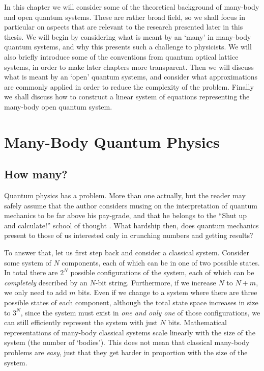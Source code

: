 In this chapter we will consider some of the theoretical background of many-body and open quantum systems. These are rather broad field, so we shall focus in particular on aspects that are relevant to the research presented later in this thesis. We will begin by considering what is meant by an `many' in many-body quantum systems, and why this presents such a challenge to physicists. We will also briefly introduce some of the conventions from quantum optical lattice systems, in order to make later chapters more transparent. Then we will discuss what is meant by an `open' quantum systems, and consider what approximations are commonly applied in order to reduce the complexity of the problem. Finally we shall discuss how to construct a linear system of equations representing the many-body open quantum system.  

\section{Many-Body Quantum Physics}

\subsection{How many?}
Quantum physics has a problem. More than one actually, but the reader may safely assume that the author considers musing on the interpretation of quantum mechanics to be far above his pay-grade, and that he belongs to the ``Shut up and calculate!'' school of thought \cite{Mermin89}. What hardship then, does quantum mechanics present to those of us interested only in crunching numbers and getting results? 

To answer that, let us first step back and consider a classical system. Consider some system of \(N\) components, each of which can be in one of two possible states. In total there are \(2^{N}\) possible configurations of the system, each of which can be \emph{completely} described by an \(N\)-bit string. Furthermore, if we increase \(N\) to \(N+m\), we only need to add \(m\) bits. Even if we change to a system where there are three possible states of each component, although the total state space increases in size to \(3^{N}\), since the system must exist in \emph{one and only one} of those configurations, we can still efficiently represent the system with just \(N\) bits. Mathematical representations of many-body classical systems scale linearly with the size of the system (the number of `bodies'). This does not mean that classical many-body problems are \emph{easy}, just that they get harder in proportion with the size of the system.  

